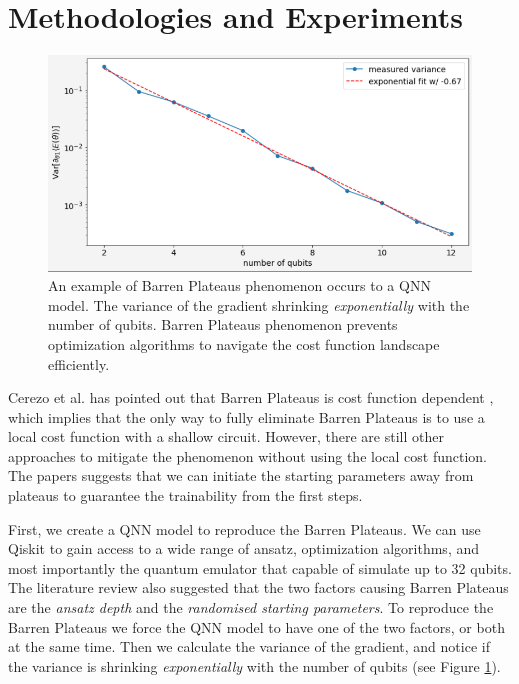 \section{Methodologies and Experiments}
\begin{figure}
    \includegraphics[width=\textwidth]{./ResearchDesign/Appendices/VarianceShrinking.png}
    \caption{
        An example of Barren Plateaus phenomenon occurs to a QNN model. 
        The variance of the gradient shrinking \textit{exponentially} with the number of qubits. 
        Barren Plateaus phenomenon prevents optimization algorithms to navigate the cost function landscape efficiently.
    }
    \label{Variance Shrinking demo}
\end{figure}

Cerezo et al. has pointed out that Barren Plateaus is cost function dependent \cite{cerezoCostFunctionDependent2021}, which implies that the only way to fully eliminate Barren Plateaus is to use a local cost function with a shallow circuit.
However, there are still other approaches to mitigate the phenomenon without using the local cost function.
The papers \cite{skolikLayerwiseLearningQuantum2021, liuParameterInitializationMethod2021} suggests that we can initiate the starting parameters away from plateaus to guarantee the trainability from the first steps.

First, we create a QNN model to reproduce the Barren Plateaus. 
We can use Qiskit to gain access to a wide range of ansatz, optimization algorithms, and most importantly the quantum emulator that capable of simulate up to 32 qubits.
The literature review also suggested that the two factors causing Barren Plateaus are the \textit{ansatz depth} and the \textit{randomised starting parameters}.
To reproduce the Barren Plateaus we force the QNN model to have one of the two factors, or both at the same time.
Then we calculate the variance of the gradient, and notice if the variance is shrinking \textit{exponentially} with the number of qubits (see Figure \ref{Variance Shrinking demo}).

